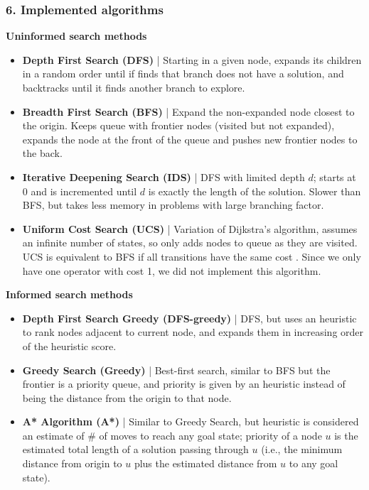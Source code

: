 \documentclass{beamer}
\begin{document}
\begin{frame}
\frametitle{6. Implemented algorithms}

\textbf{Uninformed search methods}

\begin{itemize}
  \item \textbf{Depth First Search (DFS)} | Starting in a given node, expands its children in a random order until if finds that branch does not have a solution, and backtracks until it finds another branch to explore. 
  
  \item \textbf{Breadth First Search (BFS)} |  Expand the non-expanded node closest to the origin. Keeps queue with frontier nodes (visited but not expanded), expands the node at the front of the queue and pushes new frontier nodes to the back.
  
  \item \textbf{Iterative Deepening Search (IDS)} | DFS with limited depth $d$; starts at $0$ and is incremented until $d$ is exactly the length of the solution. Slower than BFS, but takes less memory in problems with large branching factor.
  
  \item \textbf{Uniform Cost Search (UCS)} | Variation of Dijkstra's algorithm, assumes an infinite number of states, so only adds nodes to queue as they are visited.
  UCS is equivalent to BFS if all transitions have the same cost \cite{javatpoint-uninformed}.
  Since we only have one operator with cost 1, we did not implement this algorithm.
\end{itemize}
\end{frame}

\begin{frame}

\textbf{Informed search methods}

\begin{itemize}  
  \item \textbf{Depth First Search Greedy (DFS-greedy)} | DFS, but uses an heuristic to rank nodes adjacent to current node, and expands them in increasing order of the heuristic score.
  \item \textbf{Greedy Search (Greedy)} | Best-first search, similar to BFS but the frontier is a priority queue, and priority is given by an heuristic instead of being the distance from the origin to that node.
  \item \textbf{A* Algorithm (A*)} | Similar to Greedy Search, but heuristic is considered an estimate of \# of moves to reach any goal state; priority of a node $u$ is the estimated total length of a solution passing through $u$ (i.e., the minimum distance from origin to $u$ plus the estimated distance from $u$ to any goal state).
\end{itemize}
\end{frame}
\end{document}
